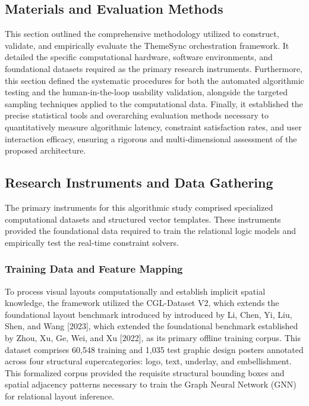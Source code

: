 \begin{refsection}
\section{Materials and Evaluation Methods}
This section outlined the comprehensive methodology utilized to construct, validate, and empirically evaluate the ThemeSync orchestration framework. It detailed the specific computational hardware, software environments, and foundational datasets required as the primary research instruments. Furthermore, this section defined the systematic procedures for both the automated algorithmic testing and the human-in-the-loop usability validation, alongside the targeted sampling techniques applied to the computational data. Finally, it established the precise statistical tools and overarching evaluation methods necessary to quantitatively measure algorithmic latency, constraint satisfaction rates, and user interaction efficacy, ensuring a rigorous and multi-dimensional assessment of the proposed architecture.

\subsection{Research Instruments and Data Gathering}
The primary instruments for this algorithmic study comprised specialized computational datasets and structured vector templates. These instruments provided the foundational data required to train the relational logic models and empirically test the real-time constraint solvers.

\subsubsection{Training Data and Feature Mapping}
To process visual layouts computationally and establish implicit spatial knowledge, the framework utilized the CGL-Dataset V2, which extends the foundational layout benchmark introduced by introduced by Li, Chen, Yi, Liu, Shen, and Wang [2023], which extended the foundational benchmark established by Zhou, Xu, Ge, Wei, and Xu [2022], as its primary offline training corpus. This dataset comprises 60,548 training and 1,035 test graphic design posters annotated across four structural supercategories: logo, text, underlay, and embellishment. This formalized corpus provided the requisite structural bounding boxes and spatial adjacency patterns necessary to train the Graph Neural Network (GNN) for relational layout inference. \cite{li2023radm, zhou2022cglgan}


\end{refsection}

